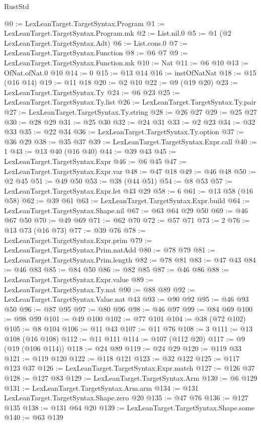 \begin{lexlean}{RustStd}
\begin{coremodule}
@0 := LexLeanTarget.TargetSyntax.Program
@1 := LexLeanTarget.TargetSyntax.Program.mk
@2 := List.nil.{0}
@5 := @1 (@2 LexLeanTarget.TargetSyntax.Adt)
@6 := List.cons.{0}
@7 := LexLeanTarget.TargetSyntax.Function
@8 := @6 @7
@9 := LexLeanTarget.TargetSyntax.Function.mk
@10 := Nat
@11 := @6 @10
@13 := OfNat.ofNat.{0} @10
@14 := 0
@15 := @13 @14
@16 := instOfNatNat
@18 := @15 (@16 @14)
@19 := @11 @18
@20 := @2 @10
@22 := @9 (@19 @20)
@23 := LexLeanTarget.TargetSyntax.Ty
@24 := @6 @23
@25 := LexLeanTarget.TargetSyntax.Ty.list
@26 := LexLeanTarget.TargetSyntax.Ty.pair
@27 := LexLeanTarget.TargetSyntax.Ty.string
@28 := @26 @27
@29 := @25 @27
@30 := @28 @29
@31 := @25 @30
@32 := @24 @31
@33 := @2 @23
@34 := @32 @33
@35 := @22 @34
@36 := LexLeanTarget.TargetSyntax.Ty.option
@37 := @36 @29
@38 := @35 @37
@39 := LexLeanTarget.TargetSyntax.Expr.call
@40 := 1
@43 := @13 @40 (@16 @40)
@44 := @39 @43
@45 := LexLeanTarget.TargetSyntax.Expr
@46 := @6 @45
@47 := LexLeanTarget.TargetSyntax.Expr.var
@48 := @47 @18
@49 := @46 @48
@50 := @2 @45
@51 := @49 @50
@53 := @38 (@44 @51)
@54 := @8 @53
@57 := LexLeanTarget.TargetSyntax.Expr.let @43 @29
@58 := 6
@61 := @13 @58 (@16 @58)
@62 := @39 @61
@63 := LexLeanTarget.TargetSyntax.Expr.build
@64 := LexLeanTarget.TargetSyntax.Shape.nil
@67 := @63 @64 @29 @50
@69 := @46 @67 @50
@70 := @49 @69
@71 := @62 @70
@72 := @57 @71
@73 := 2
@76 := @13 @73 (@16 @73)
@77 := @39 @76
@78 := LexLeanTarget.TargetSyntax.Expr.prim
@79 := LexLeanTarget.TargetSyntax.Prim.natAdd
@80 := @78 @79
@81 := LexLeanTarget.TargetSyntax.Prim.length
@82 := @78 @81
@83 := @47 @43
@84 := @46 @83
@85 := @84 @50
@86 := @82 @85
@87 := @46 @86
@88 := LexLeanTarget.TargetSyntax.Expr.value
@89 := LexLeanTarget.TargetSyntax.Ty.nat
@90 := @88 @89
@92 := LexLeanTarget.TargetSyntax.Value.nat @43
@93 := @90 @92
@95 := @46 @93 @50
@96 := @87 @95
@97 := @80 @96
@98 := @46 @97
@99 := @84 @69
@100 := @98 @99
@101 := @49 @100
@102 := @77 @101
@104 := @38 (@72 @102)
@105 := @8 @104
@106 := @11 @43
@107 := @11 @76
@108 := 3
@111 := @13 @108 (@16 @108)
@112 := @11 @111
@114 := @107 (@112 @20)
@117 := @9 (@19 (@106 @114))
@118 := @24 @89
@119 := @24 @29
@120 := @119 @33
@121 := @119 @120
@122 := @118 @121
@123 := @32 @122
@125 := @117 @123 @37
@126 := LexLeanTarget.TargetSyntax.Expr.match
@127 := @126 @37
@128 := @127 @83
@129 := LexLeanTarget.TargetSyntax.Arm
@130 := @6 @129
@131 := LexLeanTarget.TargetSyntax.Arm.arm
@134 := @131 LexLeanTarget.TargetSyntax.Shape.zero @20
@135 := @47 @76
@136 := @127 @135
@138 := @131 @64 @20
@139 := LexLeanTarget.TargetSyntax.Shape.some
@140 := @63 @139

\end{coremodule}
\end{lexlean}
